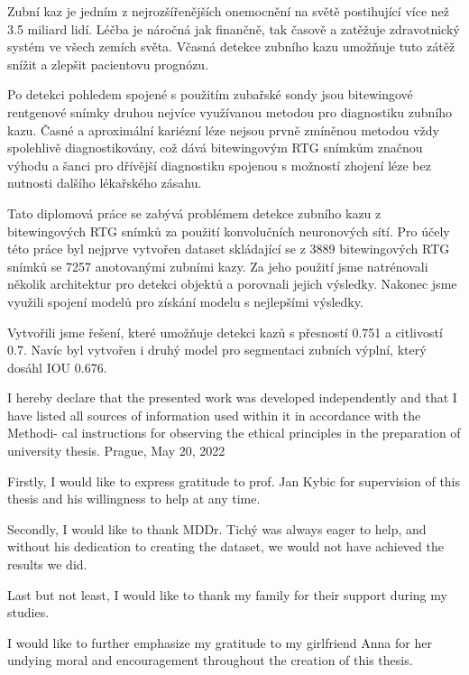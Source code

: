 \begin{abstract-czech}
Zubní kaz je jedním z nejrozšířenějších onemocnění na světě postihující více než 3.5 miliard lidí. Léčba je náročná jak finančně, tak časově a zatěžuje zdravotnický systém ve všech zemích světa. Včasná detekce zubního kazu umožňuje tuto zátěž snížit a zlepšit pacientovu prognózu. 


Po detekci pohledem spojené s použitím zubařské sondy jsou bitewingové rentgenové snímky druhou nejvíce využívanou metodou pro diagnostiku zubního kazu. Časné a aproximální kariézní léze nejsou prvně zmíněnou metodou vždy spolehlivě diagnostikovány, což dává bitewingovým RTG snímkům značnou výhodu a šanci pro dřívější diagnostiku spojenou s možností zhojení léze bez nutnosti dalšího lékařského zásahu.


Tato diplomová práce se zabývá problémem detekce zubního kazu z bitewingových RTG snímků za použití konvolučních neuronových sítí. Pro účely této práce byl nejprve vytvořen dataset skládající se z 3889 bitewingových RTG snímků se 7257 anotovanými zubními kazy. Za jeho použití jsme natrénovali několik architektur pro detekci objektů a porovnali jejich výsledky. Nakonec jsme využili spojení modelů pro získání modelu s nejlepšími výsledky.


Vytvořili jsme řešení, které umožňuje detekci kazů s přesností 0.751 a citlivostí 0.7. Navíc byl vytvořen i druhý model pro segmentaci zubních výplní, který dosáhl IOU 0.676.
\end{abstract-czech}

\begin{declaration}
    I hereby declare that the presented work
    was developed independently and that I
    have listed all sources of information used
    within it in accordance with the Methodi-
    cal instructions for observing the ethical
    principles in the preparation of university
    thesis.
    \medskip
    Prague, May 20, 2022

\end{declaration}

\begin{thanks}
    Firstly, I would like to express gratitude to prof. Jan Kybic for supervision of this thesis and his willingness to help at any time.
    \medskip

    Secondly, I would like to thank MDDr. Tichý was always eager to help, and without his dedication to creating the dataset, we would not have achieved the results we did.
    \medskip

    Last but not least, I would like to thank my family for their support during my studies.
    \medskip

    I would like to further emphasize my gratitude to my girlfriend Anna for her undying moral and encouragement throughout the creation of this thesis.
\end{thanks}